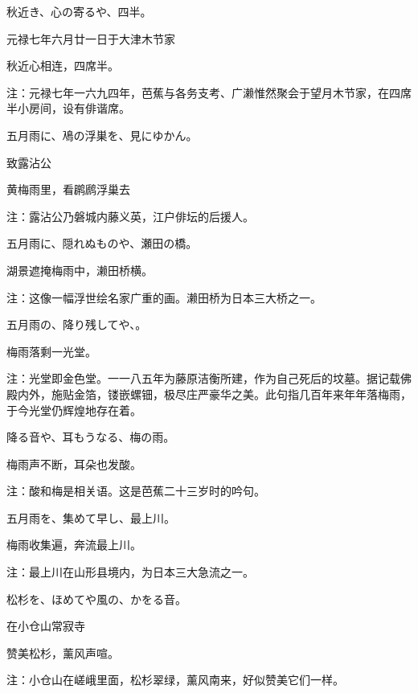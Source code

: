 \begin{haiku}
    {\FH 秋近き、心の寄るや、四半。}

    {\FK 元禄七年六月廿一日于大津木节家}

    {\FK 秋近心相连，四席半。}

    {\FT 注：元禄七年一六九四年，芭蕉与各务支考、广濑惟然聚会于望月木节家，在四席半小房间，设有俳谐席。}
\end{haiku}

\begin{haiku}
    {\FH 五月雨に、鳰の浮巣を、見にゆかん。}

    {\FK 致露沾公}

    {\FK 黄梅雨里，看䴙䴘浮巢去}

    {\FT 注：露沾公乃磐城内藤义英，江户俳坛的后援人。}
\end{haiku}

\begin{haiku}
    {\FH 五月雨に、隠れぬものや、瀬田の橋。}

    {\FK 湖景遮掩梅雨中，濑田桥横。}

    {\FT 注：这像一幅浮世绘名家广重的画。濑田桥为日本三大桥之一。}
\end{haiku}

\begin{haiku}
    {\FH 五月雨の、降り残してや、。}

    {\FK 梅雨落剩一光堂。}

    {\FT 注：光堂即金色堂。一一八五年为藤原洁衡所建，作为自己死后的坟墓。据记载佛殿内外，施贴金箔，镂嵌螺钿，极尽庄严豪华之美。此句指几百年来年年落梅雨，于今光堂仍辉煌地存在着。}
\end{haiku}

\begin{haiku}
    {\FH 降る音や、耳もうなる、梅の雨。}

    {\FK 梅雨声不断，耳朵也发酸。}

    {\FT 注：酸和梅是相关语。这是芭蕉二十三岁时的吟句。}
\end{haiku}

\begin{haiku}
    {\FH 五月雨を、集めて早し、最上川。}

    {\FK 梅雨收集遍，奔流最上川。}

    {\FT 注：最上川在山形县境内，为日本三大急流之一。}
\end{haiku}

\begin{haiku}
    {\FH 松杉を、ほめてや風の、かをる音。}

    {\FK 在小仓山常寂寺}

    {\FK 赞美松杉，薰风声喧。}

    {\FT 注：小仓山在嵯峨里面，松杉翠绿，薰风南来，好似赞美它们一样。}
\end{haiku}

